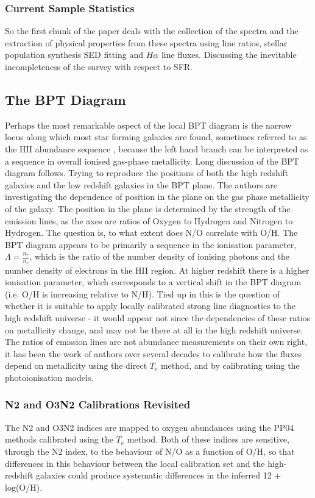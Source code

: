 \documentclass{literature}
\begin{document}
\subsubsection{Current Sample Statistics}
So the first chunk of the paper deals with the collection of the spectra and the extraction of physical properties from these spectra using line ratios, stellar population synthesis SED fitting and $H\alpha$ line fluxes. Discussing the inevitable incompleteness of the survey with respect to SFR.  

\subsection{The BPT Diagram}
Perhaps the most remarkable aspect of the local BPT diagram is the narrow locus along which most star forming galaxies are found, sometimes referred to as the HII abundance sequence \citep{Dopita2000}, because the left hand branch can be interpreted as a sequence in overall ionised gas-phase metallicity.
Long discussion of the BPT diagram follows. Trying to reproduce the positions of both the high redshift galaxies and the low redshift galaxies in the BPT plane. The authors are investigating the dependence of position in the plane on the gas phase metallicity of the galaxy. The position in the plane is determined by the strength of the emission lines, as the axes are ratios of Oxygen to Hydrogen and Nitrogen to Hydrogen. The question is, to what extent does N/O correlate with O/H. The BPT diagram appears to be primarily a sequence in the ionisation parameter, $\Lambda = \frac{n_{\gamma}}{n_{e}}$, which is the ratio of the number density of ionising photons and the number density of electrons in the HII region. At higher redshift there is a higher ionisation parameter, which corresponds to a vertical shift in the BPT diagram (i.e. O/H is increasing relative to N/H). Tied up in this is the question of whether it is suitable to apply locally calibrated strong line diagnostics to the high redshift universe - it would appear not since the dependencies of these ratios on metallicity change, and may not be there at all in the high redshift universe. The ratios of emission lines are not abundance measurements on their own right, it has been the work of authors over several decades to calibrate how the fluxes depend on metallicity using the direct $T_{e}$ method, and by calibrating using the photoionisation models.
\subsubsection{N2 and O3N2 Calibrations Revisited}
The N2 and O3N2 indices are mapped to oxygen abundances using the PP04 \citep{Pettini_2004} methods calibrated using the $T_{e}$ method. Both of these indices are sensitive, through the N2 index, to the behaviour of N/O as a function of O/H, so that differences in this behaviour between the local calibration set and the high-redshift galaxies could produce systematic differences in the inferred 12 + log(O/H).
\end{document}
